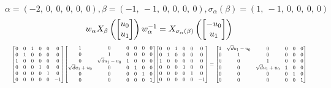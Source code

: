 \documentclass[11pt]{article}
\theoremstyle{definition}
\begin{document}
\[
\alpha = \left( -2, \  0, \  0, \  0, \  0, \  0\right), \beta = \left( -1, \  -1, \  0, \  0, \  0, \  0\right), \sigma_{\alpha}(\beta) = \left( 1, \  -1, \  0, \  0, \  0, \  0\right)
\]
\[
\scaletoalign{\textwidth}{w_{\alpha} X_{\beta}\left(\left[\begin{matrix}u_{0}\\u_{1}\end{matrix}\right]\right) w_{\alpha}^{-1} = X_{\sigma_{\alpha}\left(\beta\right)}\left(\left[\begin{matrix}- u_{0}\\u_{1}\end{matrix}\right]\right)}
\]
\[
\scaletoalign{\textwidth}{{\left[\begin{matrix}0 & 0 & 1 & 0 & 0 & 0\\0 & 1 & 0 & 0 & 0 & 0\\1 & 0 & 0 & 0 & 0 & 0\\0 & 0 & 0 & 1 & 0 & 0\\0 & 0 & 0 & 0 & 1 & 0\\0 & 0 & 0 & 0 & 0 & -1\end{matrix}\right]} {\left[\begin{matrix}1 & 0 & 0 & 0 & 0 & 0\\0 & 1 & 0 & 0 & 0 & 0\\0 & \sqrt{d} u_{1} - u_{0} & 1 & 0 & 0 & 0\\\sqrt{d} u_{1} + u_{0} & 0 & 0 & 1 & 0 & 0\\0 & 0 & 0 & 0 & 1 & 0\\0 & 0 & 0 & 0 & 0 & 1\end{matrix}\right]} {\left[\begin{matrix}0 & 0 & 1 & 0 & 0 & 0\\0 & 1 & 0 & 0 & 0 & 0\\1 & 0 & 0 & 0 & 0 & 0\\0 & 0 & 0 & 1 & 0 & 0\\0 & 0 & 0 & 0 & 1 & 0\\0 & 0 & 0 & 0 & 0 & -1\end{matrix}\right]} = {\left[\begin{matrix}1 & \sqrt{d} u_{1} - u_{0} & 0 & 0 & 0 & 0\\0 & 1 & 0 & 0 & 0 & 0\\0 & 0 & 1 & 0 & 0 & 0\\0 & 0 & \sqrt{d} u_{1} + u_{0} & 1 & 0 & 0\\0 & 0 & 0 & 0 & 1 & 0\\0 & 0 & 0 & 0 & 0 & 1\end{matrix}\right]}}
\]
\end{document}
